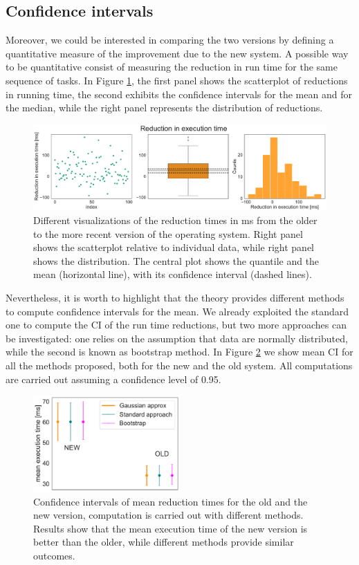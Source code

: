 \documentclass[twoside,onecolumn]{article}
\theoremstyle{definition}
\begin{document}
\subsection{Confidence intervals}
Moreover, we could be interested in comparing the two versions by defining a quantitative measure of the improvement due to the new system. A possible way to be quantitative  consist of measuring the reduction in run time for the same sequence of tasks. In Figure \ref{fig:reduction}, the first panel shows the scatterplot of reductions in running time, the second exhibits the confidence intervals for the mean and for the median, while the right panel represents the distribution of reductions.

\begin{figure} \centering
\includegraphics[width=1\textwidth]{../figs/extimes_reduction.pdf}
\caption{Different visualizations of the reduction times in ms from the older to the more recent version of the operating system. Right panel shows the scatterplot relative to individual data, while right panel shows the distribution. The central plot shows the quantile and the mean (horizontal line), with its confidence interval (dashed lines).}\label{fig:reduction}
\end{figure}

Nevertheless, it is worth to highlight that the theory provides different methods to compute confidence intervals for the mean. We already exploited the standard one to compute the CI of the run time reductions, but two more approaches can be investigated: one relies on the assumption that data are normally distributed, while the second is known as bootstrap method. In Figure \ref{fig:ci_methods} we show mean CI for all the methods proposed, both for the new and the old system.
All computations are carried out assuming a confidence level of 0.95.

\begin{figure} \centering
\includegraphics[width=0.5\textwidth]{../figs/CI_methods_comparison.pdf}
\caption{Confidence intervals of mean reduction times for the old and the new version, computation is carried out with different methods. Results show that the mean execution time of the new version is better than the older, while different methods provide similar outcomes.}\label{fig:ci_methods}
\end{figure}
\end{document}
